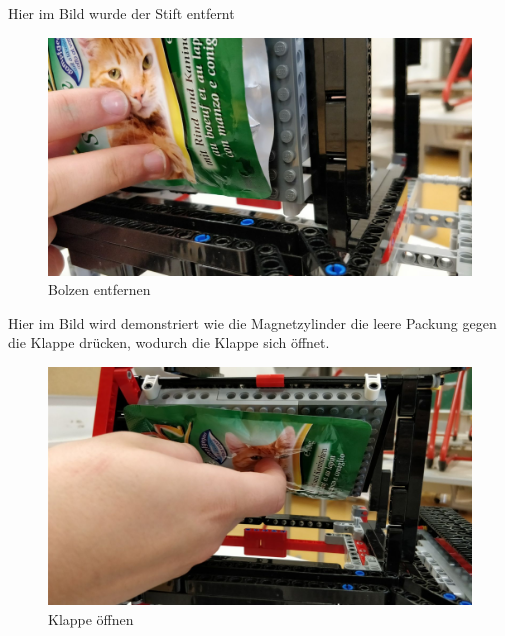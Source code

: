Hier im Bild wurde der Stift entfernt 

\begin{figure}[H]
\begin{center}
\includegraphics[width=13cm]{Bilder/Ablauf_1_png/Auswurf_3}
\caption{Bolzen entfernen}
\label{Bolzen entfernen}
\end{center}
\end{figure}

Hier im Bild wird demonstriert wie die Magnetzylinder die leere Packung gegen die Klappe drücken, wodurch die Klappe sich öffnet.

\begin{figure}[H]
\begin{center}
\includegraphics[width=13cm]{Bilder/Ablauf_1_png/Auswurf_4}
\caption{Klappe öffnen}
\label{Klappe öffnen}
\end{center}
\end{figure}

